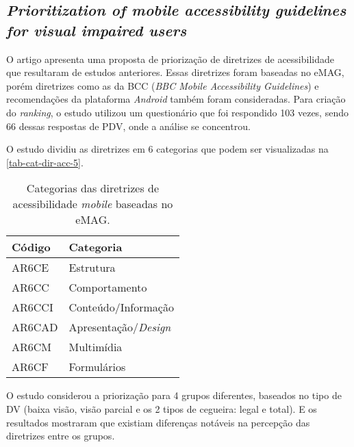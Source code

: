 \subsection{\emph{Prioritization of mobile accessibility guidelines for visual impaired users}}

O artigo apresenta uma proposta de priorização de diretrizes de acessibilidade que resultaram de estudos anteriores.
Essas diretrizes foram baseadas no eMAG, porém diretrizes como as da BCC (\emph{BBC Mobile Accessibility Guidelines}) e recomendações da plataforma \emph{Android} também foram consideradas.
Para criação do \emph{ranking}, o estudo utilizou um questionário que foi respondido 103 vezes, sendo 66 dessas respostas de PDV, onde a análise se concentrou.

O estudo dividiu as diretrizes em 6 categorias que podem ser visualizadas na \autoref{tab-cat-dir-acc-5}.

\begin{table}[htb]
  \begin{center}
    \ABNTEXfontereduzida
    \caption{Categorias das diretrizes de acessibilidade \emph{mobile} baseadas no eMAG.}
    \label{tab-cat-dir-acc-5}
    \begin{tabular}{p{1.5cm}|p{4.5cm}}
      \textbf{Código} & \textbf{Categoria}         \\
      \hline
      AR6CE           & Estrutura                  \\
      \hline
      AR6CC           & Comportamento              \\
      \hline
      AR6CCI          & Conteúdo/Informação        \\
      \hline
      AR6CAD          & Apresentação/\emph{Design} \\
      \hline
      AR6CM           & Multimídia                 \\
      \hline
      AR6CF           & Formulários                \\
    \end{tabular}
  \end{center}
\end{table}

O estudo considerou a priorização para 4 grupos diferentes, baseados no tipo de DV (baixa visão, visão parcial e os 2 tipos de cegueira: legal e total).
E os resultados mostraram que existiam diferenças notáveis na percepção das diretrizes entre os grupos.

